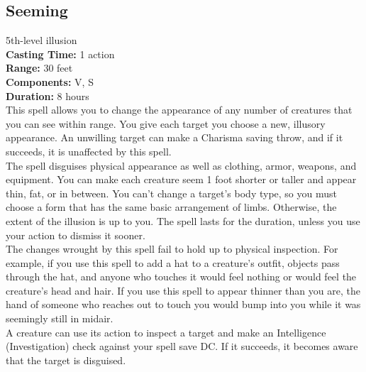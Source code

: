 \documentclass[11pt, A4paper, english]{article}
\begin{document}
		\subsection{Seeming}
5th-level illusion \\
\textbf{Casting Time:} 1 action \\
\textbf{Range:} 30 feet \\
\textbf{Components:} V, S \\
\textbf{Duration:} 8 hours \\
This spell allows you to change the appearance of any number of creatures that you can see within range. You give each target you choose a new, illusory appearance. An unwilling target can make a Charisma saving throw, and if it succeeds, it is unaffected by this spell. \\
The spell disguises physical appearance as well as clothing, armor, weapons, and equipment. You can make each creature seem  1  foot shorter or taller and appear thin, fat, or in between. You can’t change a target’s body type, so you must choose a form that has the same basic arrangement of limbs. Otherwise, the extent of the illusion is up to you. The spell lasts for the duration, unless you use your action to dismiss it sooner. \\
The changes wrought by this spell fail to hold up to physical inspection. For example, if you use this spell to add a hat to a creature’s outfit, objects pass through the hat, and anyone who touches it would feel nothing or would feel the creature’s head and hair. If you use this spell to appear thinner than you are, the hand of someone who reaches out to touch you would bump into you while it was seemingly still in midair. \\
A creature can use its action to inspect a target and make an Intelligence (Investigation) check against your spell save DC. If it succeeds, it becomes aware that the target is disguised.
\end{document}
